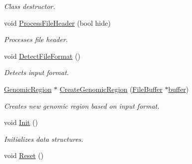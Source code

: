 \begin{CompactItemize}
\begin{CompactList}\small\item\em Class destructor. \item\end{CompactList}\item 
\hypertarget{classGenomicRegionSet_6992ccc0c4dd8be0ad4be9b991ab9f36}{
void \hyperlink{classGenomicRegionSet_6992ccc0c4dd8be0ad4be9b991ab9f36}{ProcessFileHeader} (bool hide)}
\label{classGenomicRegionSet_6992ccc0c4dd8be0ad4be9b991ab9f36}

\begin{CompactList}\small\item\em Processes file header. \item\end{CompactList}\item 
\hypertarget{classGenomicRegionSet_5721a1d9ca4ca18ddbcad1e563d42019}{
void \hyperlink{classGenomicRegionSet_5721a1d9ca4ca18ddbcad1e563d42019}{DetectFileFormat} ()}
\label{classGenomicRegionSet_5721a1d9ca4ca18ddbcad1e563d42019}

\begin{CompactList}\small\item\em Detects input format. \item\end{CompactList}\item 
\hypertarget{classGenomicRegionSet_4e8e101aebcedd6a5892d463fe830450}{
\hyperlink{classGenomicRegion}{GenomicRegion} $\ast$ \hyperlink{classGenomicRegionSet_4e8e101aebcedd6a5892d463fe830450}{CreateGenomicRegion} (\hyperlink{classFileBuffer}{FileBuffer} $\ast$\hyperlink{classGenomicRegionSet_df3a5598e31ddbb5b381125925362085}{buffer})}
\label{classGenomicRegionSet_4e8e101aebcedd6a5892d463fe830450}

\begin{CompactList}\small\item\em Creates new genomic region based on input format. \item\end{CompactList}\item 
\hypertarget{classGenomicRegionSet_94b1955e7a4127efaceba25429af7568}{
void \hyperlink{classGenomicRegionSet_94b1955e7a4127efaceba25429af7568}{Init} ()}
\label{classGenomicRegionSet_94b1955e7a4127efaceba25429af7568}

\begin{CompactList}\small\item\em Initializes data structures. \item\end{CompactList}\item 
\hypertarget{classGenomicRegionSet_ae7295913424148013df6a154c5458aa}{
void \hyperlink{classGenomicRegionSet_ae7295913424148013df6a154c5458aa}{Reset} ()}
\label{classGenomicRegionSet_ae7295913424148013df6a154c5458aa}


\end{CompactItemize}

